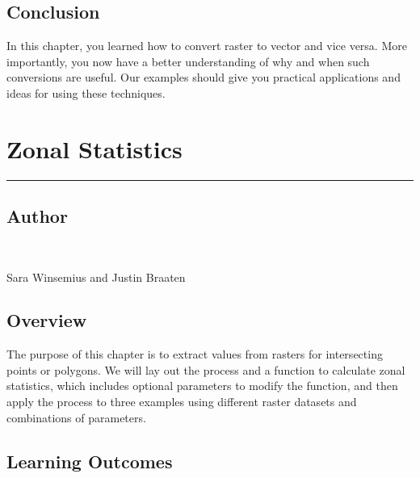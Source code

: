 \documentclass[
  letterpaper,
  DIV=11,
  numbers=noendperiod]{scrreprt}
\begin{document}
\hypertarget{conclusion-18}{%
\section*{Conclusion}\label{conclusion-18}}


In this chapter, you learned how to convert raster to vector and vice
versa. More importantly, you now have a better understanding of why and
when such conversions are useful. Our examples should give you practical
applications and ideas for using these techniques.

\hypertarget{zonal-statistics}{%
\chapter{Zonal Statistics}\label{zonal-statistics}}

\begin{center}\rule{0.5\linewidth}{0.5pt}\end{center}

\hypertarget{author-17}{%
\section*{Author}\label{author-17}}


~

Sara Winsemius and Justin Braaten

\hypertarget{overview-18}{%
\section*{Overview}\label{overview-18}}


The purpose of this chapter is to extract values from rasters for
intersecting points or polygons. We will lay out the process and a
function to calculate zonal statistics, which includes optional
parameters to modify the function, and then apply the process to three
examples using different raster datasets and combinations of parameters.

\hypertarget{learning-outcomes-18}{%
\section*{Learning Outcomes}\label{learning-outcomes-18}}
\end{document}
